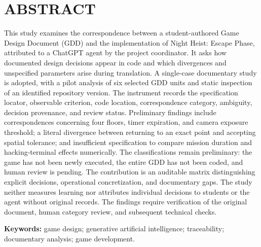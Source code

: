 \noindent\begin{minipage}{\linewidth}
\section*{ABSTRACT}
\begin{resumotexto}
This study examines the correspondence between a student-authored Game Design Document (GDD) and the implementation of Night Heist: Escape Phase, attributed to a ChatGPT agent by the project coordinator. It asks how documented design decisions appear in code and which divergences and unspecified parameters arise during translation. A single-case documentary study is adopted, with a pilot analysis of six selected GDD units and static inspection of an identified repository version. The instrument records the specification locator, observable criterion, code location, correspondence category, ambiguity, decision provenance, and review status. Preliminary findings include correspondences concerning four floors, timer expiration, and camera exposure threshold; a literal divergence between returning to an exact point and accepting spatial tolerance; and insufficient specification to compare mission duration and hacking-terminal effects numerically. The classifications remain preliminary: the game has not been newly executed, the entire GDD has not been coded, and human review is pending. The contribution is an auditable matrix distinguishing explicit decisions, operational concretization, and documentary gaps. The study neither measures learning nor attributes individual decisions to students or the agent without original records. The findings require verification of the original document, human category review, and subsequent technical checks.

\end{resumotexto}
\noindent\textbf{Keywords:} game design; generative artificial intelligence; traceability; documentary analysis; game development.
\end{minipage}
